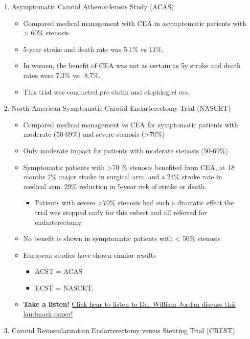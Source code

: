 \documentclass[
]{book}
\providecommand{\tightlist}{%
  \setlength{\itemsep}{0pt}\setlength{\parskip}{0pt}}
\begin{document}
\begin{enumerate}
\def\labelenumi{\arabic{enumi}.}
\item
  Asymptomatic Carotid Atherosclerosis Study (ACAS)

  \begin{itemize}
  \item
    Compared medical management with CEA in asymptomatic patients
    with \textgreater{} 60\% stenosis.
  \item
    5-year stroke and death rate was 5.1\% vs 11\%.
  \item
    In women, the benefit of CEA was not as certain as 5y stroke and
    death rates were 7.3\% vs.~8.7\%.
  \item
    This trial was conducted pre-statin and clopidogrel era.
  \end{itemize}
\item
  North American Symptomatic Carotid Endarterectomy Trial (NASCET)
  \citep{northamericansymptomaticcarotidendarterectomytrialcollaboratorsBeneficialEffectCarotid1991}

  \begin{itemize}
  \item
    Compared medical management vs CEA for symptomatic patients with
    moderate (50-69\%) and severe stenosis (\textgreater70\%)
  \item
    Only moderate impact for patients with moderate stenosis
    (50-69\%)
  \item
    Symptomatic patients with \textgreater70 \% stenosis benefited from CEA, at
    18 months 7\% major stroke in surgical arm, and a 24\% stroke rate
    in medical arm. 29\% reduction in 5-year risk of stroke or death.

    \begin{itemize}
    \tightlist
    \item
      Patients with severe \textgreater70\% stenosis had such a dramatic
      effect the trial was stopped early for this subset and all
      referred for endarterectomy.
    \end{itemize}
  \item
    No benefit is shown in symptomatic patients with \textless{} 50\% stenosis
  \item
    European studies have shown similar results

    \begin{itemize}
    \item
      ACST = ACAS
    \item
      ECST = NASCET.
    \end{itemize}
  \item
    \textbf{Take a listen!} \href{https://www.audiblebleeding.com/2021/09/29/landmark-papers-nascet/}{Click hear to listen to Dr.~William Jordan
    discuss this landmark
    paper!}
  \end{itemize}
\item
  Carotid Revascularization Endarterectomy versus Stenting Trial
  (CREST).


\end{enumerate}
\end{document}
